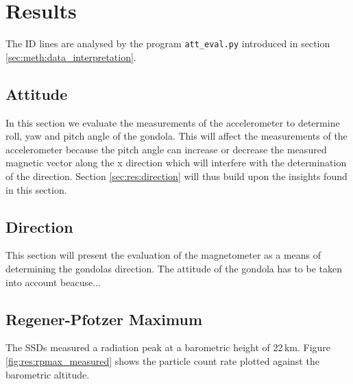 \chapter{Results \label{ch:results}}
The ID lines are analysed by the program \verb|att_eval.py| introduced in section \ref{sec:meth:data_interpretation}.

\section{Attitude \label{sec:res:attitude}}
In this section we evaluate the measurements of the accelerometer to determine roll, yaw and pitch angle of the gondola. This will affect the measurements of the accelerometer because the pitch angle can increase or decrease the measured magnetic vector along the x direction which will interfere with the determination of the direction. Section \ref{sec:res:direction} will thus build upon the insights found in this section. 

\section{Direction \label{sec:res:direction}}
This section will present the evaluation of the magnetometer as a means of determining the gondolas direction. The attitude of the gondola has to be taken into account beacuse...

\section{Regener-Pfotzer Maximum \label{sec:res:regener-pfotzer}}
The \acp{SSD} measured a radiation peak at a barometric height of 22\,km. Figure \ref{fig:res:rpmax_measured} shows the particle count rate plotted against the barometric altitude.